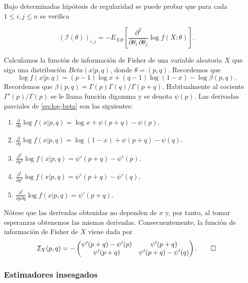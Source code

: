     Bajo determinadas hipótesis de regularidad se puede probar que para cada $1 \le i, j \le n$ se verifica

    \[{\left(\mathcal{I} \left(\theta \right) \right)}_{i, j} =
      -E_{X|\theta}\left[\frac{\partial^2}{\partial\theta_i \, \partial\theta_j} \log f(X;\theta)
    \right].\]

    \begin{ex}
        Calculamos la función de información de Fisher de una variable aleatoria $X$ que siga una distribución $Beta(x | p, q)$, donde $\theta = (p, q)$. Recordemos que
        \begin{equation} \label{eq:log-beta}
            \log f(x | p, q) = (p-1) \log x + (q-1) \log (1-x) - \log \beta(p, q).
        \end{equation}
        Recordemos que $\beta(p,q) = \Gamma(p) \Gamma(q) / \Gamma(p+q)$. Habitualmente al cociente $\Gamma'(p)/\Gamma(p)$ se le llama función digamma y se denota $\psi(p)$. Las derivadas parciales de \eqref{eq:log-beta} son las siguientes:
        \begin{enumerate}
            \item $\frac{\partial}{\partial p} \log f(x | p, q) = \log x + \psi(p+q) - \psi(p).$
            \item $\frac{\partial}{\partial q} \log f(x | p, q) = \log(1-x) + \psi(p+q) - \psi(q).$
            \item $\frac{\partial^2}{\partial p^2} \log f(x | p, q) = \psi'(p+q) - \psi'(p).$
            \item $\frac{\partial^2}{\partial q^2} \log f(x | p, q) = \psi'(p+q) - \psi'(q).$
            \item $\frac{\partial^2}{\partial p\partial q} \log f(x | p, q) = \psi'(p+q).$
        \end{enumerate}

        Nótese que las derivadas obtenidas no dependen de $x$ y, por tanto, al tomar esperanzas obtenemos las mismas derivadas. Consecuentemente, la función de información de Fisher de $X$ viene dada por
        \[\mathcal{I}_X(p, q) = - \left(\begin{matrix} \psi'(p+q) - \psi'(p) & \psi'(p+q) \\ \psi'(p+q) & \psi'(p+q) - \psi'(q) \end{matrix}\right). \qedhere\]

    \end{ex}

    \subsubsection{Estimadores insesgados}

